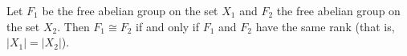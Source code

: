 Let $F_1$ be the free abelian group on the set $X_1$ and $F_2$ the free abelian group on the set $X_2$. Then $F_1 \cong F_2$ if and only if $F_1$ and $F_2$ have the same rank (that is, $|X_1| = |X_2|$).
